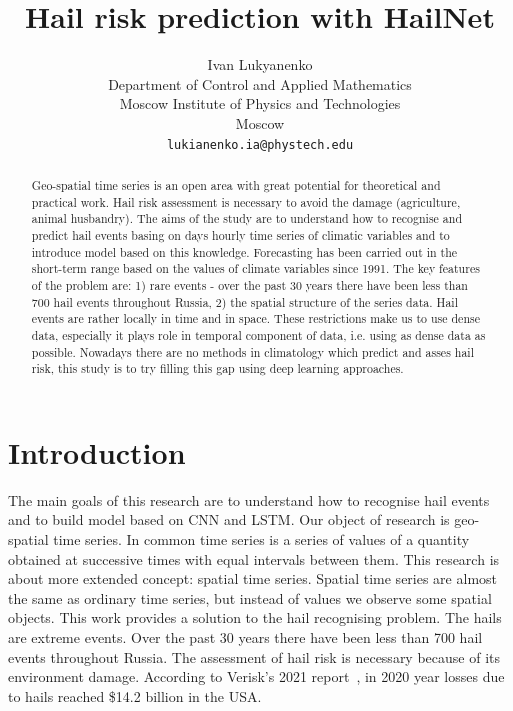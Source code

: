 \documentclass{article}
\title{Hail risk prediction with HailNet}
\author{ Ivan Lukyanenko \\
	Department of Control and Applied Mathematics\\
	Moscow Institute of Physics and Technologies\\
	Moscow \\
	\texttt{lukianenko.ia@phystech.edu} \\
}
\date{}
\begin{document}
\fontsize{12}{20pt}\selectfont
\maketitle

\begin{abstract}
	Geo-spatial time series is an open area with great potential for theoretical and practical work. Hail risk assessment is necessary to avoid the damage (agriculture, animal husbandry). The aims of the study are to understand how to recognise and predict hail events basing on days hourly time series of climatic variables and to introduce model based on this knowledge. Forecasting has been carried out in the short-term range based on the values of climate variables since 1991. The key features of the problem are: 1) rare events - over the past 30 years there have been less than 700 hail events throughout Russia, 2) the spatial structure of the series data. Hail events are rather locally in time and in space. These restrictions make us to use dense data, especially it plays role in temporal component of data, i.e. using as dense data as possible. Nowadays there are no methods in climatology which predict and asses hail risk, this study is to try filling this gap using deep learning approaches.
\end{abstract}



\section{Introduction}
The main goals of this research are to understand how to recognise hail events and to build model based on CNN and LSTM. Our object of research is geo-spatial time series. In common time series is a series of values of a quantity obtained at successive times with equal intervals between them. This research is about more extended concept: spatial time series. Spatial time series are almost the same as ordinary time series, but instead of values we observe some spatial objects. This work provides a solution to the hail recognising problem. The hails are extreme events. Over the past 30 years there have been less than 700 hail events throughout Russia. The assessment of hail risk is necessary because of its environment damage. According to Verisk’s 2021 report~\cite{haillosses}, in 2020 year losses due to hails reached \$14.2 billion in the USA.
\end{document}
